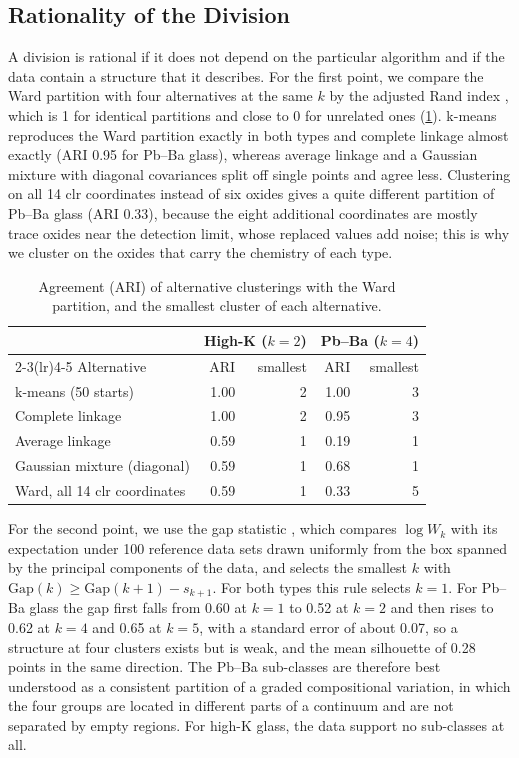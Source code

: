 \documentclass[11pt,a4paper]{article}
\begin{document}
\subsection{Rationality of the Division}
A division is rational if it does not depend on the particular algorithm and if the data contain a structure that it describes.
For the first point, we compare the Ward partition with four alternatives at the same $k$ by the adjusted Rand index \citep{hubert1985}, which is 1 for identical partitions and close to 0 for unrelated ones (\cref{tab:rat}).
k-means reproduces the Ward partition exactly in both types and complete linkage almost exactly (ARI 0.95 for Pb--Ba glass), whereas average linkage and a Gaussian mixture with diagonal covariances split off single points and agree less.
Clustering on all 14 clr coordinates instead of six oxides gives a quite different partition of Pb--Ba glass (ARI 0.33), because the eight additional coordinates are mostly trace oxides near the detection limit, whose replaced values add noise; this is why we cluster on the oxides that carry the chemistry of each type.

\begin{table}[ht]
\centering
\caption{Agreement (ARI) of alternative clusterings with the Ward partition, and the smallest cluster of each alternative.}\label{tab:rat}
\small
\begin{tabular}{lrrrr}
\toprule
& \multicolumn{2}{c}{High-K ($k=2$)} & \multicolumn{2}{c}{Pb--Ba ($k=4$)} \\
\cmidrule(lr){2-3}\cmidrule(lr){4-5}
Alternative & ARI & smallest & ARI & smallest \\
\midrule
k-means (50 starts) & 1.00 & 2 & 1.00 & 3 \\
Complete linkage & 1.00 & 2 & 0.95 & 3 \\
Average linkage & 0.59 & 1 & 0.19 & 1 \\
Gaussian mixture (diagonal) & 0.59 & 1 & 0.68 & 1 \\
Ward, all 14 clr coordinates & 0.59 & 1 & 0.33 & 5 \\
\bottomrule
\end{tabular}
\end{table}

For the second point, we use the gap statistic \citep{tibshirani2001}, which compares $\log W_k$ with its expectation under 100 reference data sets drawn uniformly from the box spanned by the principal components of the data, and selects the smallest $k$ with $\text{Gap}(k)\ge\text{Gap}(k+1)-s_{k+1}$.
For both types this rule selects $k=1$.
For Pb--Ba glass the gap first falls from 0.60 at $k=1$ to 0.52 at $k=2$ and then rises to 0.62 at $k=4$ and 0.65 at $k=5$, with a standard error of about 0.07, so a structure at four clusters exists but is weak, and the mean silhouette of 0.28 points in the same direction.
The Pb--Ba sub-classes are therefore best understood as a consistent partition of a graded compositional variation, in which the four groups are located in different parts of a continuum and are not separated by empty regions.
For high-K glass, the data support no sub-classes at all.
\end{document}
